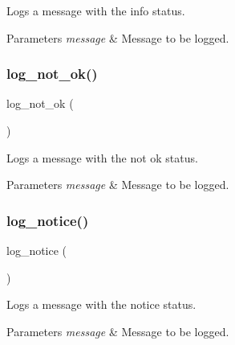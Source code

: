 Logs a message with the \textquotesingle{}info\textquotesingle{} status. 


\begin{DoxyParams}{Parameters}
{\em message} & Message to be logged. \\
\hline
\end{DoxyParams}
\mbox{\label{group__log_gae751dcb14187d5a6df81d879bf8fc943}} 
\subsubsection{\texorpdfstring{log\+\_\+not\+\_\+ok()}{log\_not\_ok()}}
{\footnotesize\ttfamily log\+\_\+not\+\_\+ok (\begin{DoxyParamCaption}\item[{message}]{ }\end{DoxyParamCaption})}



Logs a message with the \textquotesingle{}not ok\textquotesingle{} status. 


\begin{DoxyParams}{Parameters}
{\em message} & Message to be logged. \\
\hline
\end{DoxyParams}
\mbox{\label{group__log_ga09a7d78f794ff2cc825e3cf0f4bb6b84}} 
\subsubsection{\texorpdfstring{log\+\_\+notice()}{log\_notice()}}
{\footnotesize\ttfamily log\+\_\+notice (\begin{DoxyParamCaption}\item[{message}]{ }\end{DoxyParamCaption})}



Logs a message with the \textquotesingle{}notice\textquotesingle{} status. 


\begin{DoxyParams}{Parameters}
{\em message} & Message to be logged. \\
\hline
\end{DoxyParams}
\mbox{\label{group__log_ga7568aef6b2176c077d4feb5c85ab1444}} 
